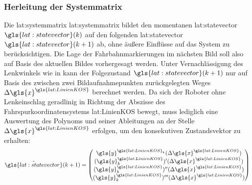 \subsubsection{Herleitung der Systemmatrix}
Die \glsdesc{lat:systemmatrix} \gls{lat:systemmatrix} bildet den momentanen \glsdesc{lat:statevector} \(\gls{lat:statevector}(\scl{k})\) auf den folgenden \glsdesc{lat:statevector} \(\gls{lat:statevector}(\scl{k}+1)\) ab, ohne äußere Einflüsse auf das System zu berücksichtigen. Die Lage der Fahrbahnmarkierungen im nächsten Bild soll also auf Basis des aktuellen Bildes vorhergesagt werden.
Unter Vernachlässigung des Lenkwinkels wie in \autocite[48]{petersfalkoFPGAbasierteBildverarbeitungspipelineZur2009} kann der Folgezustand  \(\gls{lat:statevector}(\scl{k}+1)\) nur auf Basis des zwischen zwei Bildaufnahmepunkten zurückgelegten Weges \(\scl{\Delta\gls{x}}^{\gls{lat:LinienKOS}}\) berechnet werden. Da sich der Roboter ohne Lenkeinschlag geradlinig in Richtung der Abszisse des Fahrspurkoordinatensystems \gls{lat:LinienKOS} bewegt, muss lediglich eine Auswertung des Polynoms und seiner Ableitungen an der Stelle \(\scl{\Delta\gls{x}}^{\gls{lat:LinienKOS}}\) erfolgen, um den konsekutiven Zustandsvektor zu erhalten:
\begin{equation}
\label{eq:nextstatemapping}
\hat{\gls{lat:statevector}}(\scl{k}+1) =
\begin{pmatrix}
\gls{y}^{\gls{lat:LinienKOS}_{\scl{k}}}(\scl{\Delta\gls{x}}^{\gls{lat:LinienKOS}}) \\
\der{(\gls{y}^{\gls{lat:LinienKOS}}_{\scl{k}})}(\scl{\Delta\gls{x}}^{\gls{lat:LinienKOS}}) \\
\derII{(\gls{y}^{\gls{lat:LinienKOS}}_{\scl{k}})}(\scl{\Delta\gls{x}}^{\gls{lat:LinienKOS}}) \\
\derIII{(\gls{y}^{\gls{lat:LinienKOS}}_{\scl{k}})}(\scl{\Delta\gls{x}}^{\gls{lat:LinienKOS}}) \\
\end{pmatrix}
\end{equation}

